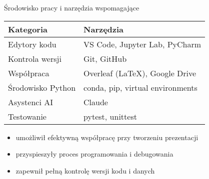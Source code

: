 \begin{frame}{Środowisko pracy i narzędzia wspomagające}
    \begin{table}[h]
        \footnotesize
        \begin{tabular}{lp{8cm}}
            \toprule
            \textbf{Kategoria} & \textbf{Narzędzia} \\
            \midrule
            Edytory kodu & VS Code, Jupyter Lab, PyCharm \\
            Kontrola wersji & Git, GitHub \\
            Współpraca & Overleaf (LaTeX), Google Drive \\
            Środowisko Python & conda, pip, virtual environments \\
            Asystenci AI & Claude \\
            Testowanie & pytest, unittest \\
            \bottomrule
        \end{tabular}
    \end{table}
    
    \vspace{0.5cm}
    
    \begin{itemize}
        \item {} umożliwił efektywną współpracę przy tworzeniu prezentacji
        \item {} przyspieszyły proces programowania i debugowania
        \item {} zapewnił pełną kontrolę wersji kodu i danych
    \end{itemize}
\end{frame}

